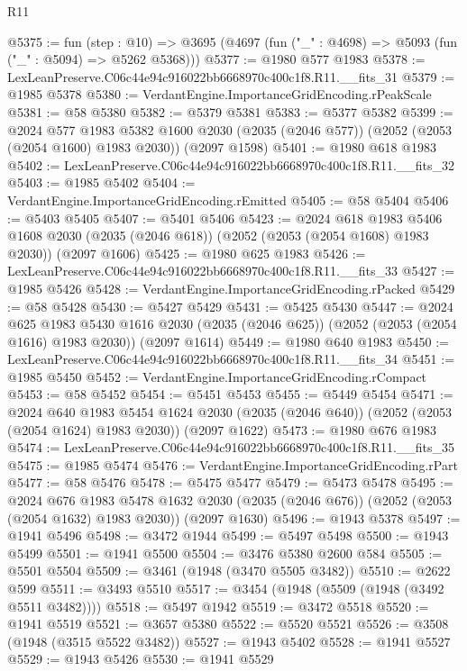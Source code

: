 \begin{lexlean}{R11}
\begin{coremodule}
@5375 := fun (step : @10) =>
  @3695 (@4697 (fun ("_" : @4698) => @5093 (fun ("_" : @5094) => @5262 @5368)))
@5377 := @1980 @577 @1983
@5378 := LexLeanPreserve.C06c44e94c916022bb6668970c400c1f8.R11.__fits_31
@5379 := @1985 @5378
@5380 := VerdantEngine.ImportanceGridEncoding.rPeakScale
@5381 := @58 @5380
@5382 := @5379 @5381
@5383 := @5377 @5382
@5399 := @2024
    @577
    @1983
    @5382
    @1600
    @2030
    (@2035 (@2046 @577))
    (@2052 (@2053 (@2054 @1600) @1983 @2030))
    (@2097 @1598)
@5401 := @1980 @618 @1983
@5402 := LexLeanPreserve.C06c44e94c916022bb6668970c400c1f8.R11.__fits_32
@5403 := @1985 @5402
@5404 := VerdantEngine.ImportanceGridEncoding.rEmitted
@5405 := @58 @5404
@5406 := @5403 @5405
@5407 := @5401 @5406
@5423 := @2024
    @618
    @1983
    @5406
    @1608
    @2030
    (@2035 (@2046 @618))
    (@2052 (@2053 (@2054 @1608) @1983 @2030))
    (@2097 @1606)
@5425 := @1980 @625 @1983
@5426 := LexLeanPreserve.C06c44e94c916022bb6668970c400c1f8.R11.__fits_33
@5427 := @1985 @5426
@5428 := VerdantEngine.ImportanceGridEncoding.rPacked
@5429 := @58 @5428
@5430 := @5427 @5429
@5431 := @5425 @5430
@5447 := @2024
    @625
    @1983
    @5430
    @1616
    @2030
    (@2035 (@2046 @625))
    (@2052 (@2053 (@2054 @1616) @1983 @2030))
    (@2097 @1614)
@5449 := @1980 @640 @1983
@5450 := LexLeanPreserve.C06c44e94c916022bb6668970c400c1f8.R11.__fits_34
@5451 := @1985 @5450
@5452 := VerdantEngine.ImportanceGridEncoding.rCompact
@5453 := @58 @5452
@5454 := @5451 @5453
@5455 := @5449 @5454
@5471 := @2024
    @640
    @1983
    @5454
    @1624
    @2030
    (@2035 (@2046 @640))
    (@2052 (@2053 (@2054 @1624) @1983 @2030))
    (@2097 @1622)
@5473 := @1980 @676 @1983
@5474 := LexLeanPreserve.C06c44e94c916022bb6668970c400c1f8.R11.__fits_35
@5475 := @1985 @5474
@5476 := VerdantEngine.ImportanceGridEncoding.rPart
@5477 := @58 @5476
@5478 := @5475 @5477
@5479 := @5473 @5478
@5495 := @2024
    @676
    @1983
    @5478
    @1632
    @2030
    (@2035 (@2046 @676))
    (@2052 (@2053 (@2054 @1632) @1983 @2030))
    (@2097 @1630)
@5496 := @1943 @5378
@5497 := @1941 @5496
@5498 := @3472 @1944
@5499 := @5497 @5498
@5500 := @1943 @5499
@5501 := @1941 @5500
@5504 := @3476 @5380 @2600 @584
@5505 := @5501 @5504
@5509 := @3461 (@1948 (@3470 @5505 @3482))
@5510 := @2622 @599
@5511 := @3493 @5510
@5517 := @3454 (@1948 (@5509 (@1948 (@3492 @5511 @3482))))
@5518 := @5497 @1942
@5519 := @3472 @5518
@5520 := @1941 @5519
@5521 := @3657 @5380
@5522 := @5520 @5521
@5526 := @3508 (@1948 (@3515 @5522 @3482))
@5527 := @1943 @5402
@5528 := @1941 @5527
@5529 := @1943 @5426
@5530 := @1941 @5529

\end{coremodule}
\end{lexlean}
